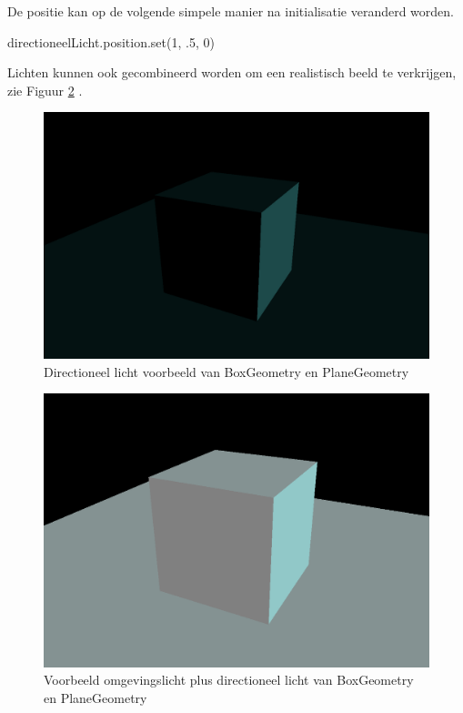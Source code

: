 De positie kan op de volgende simpele manier na initialisatie veranderd worden.

\begin{LVerbatim}
directioneelLicht.position.set(1, .5, 0)
\end{LVerbatim}

Lichten kunnen ook gecombineerd worden om een realistisch beeld te verkrijgen, zie Figuur  \ref{fig:ambientPlusDirectionalLight}  \autocite{Simon2023}.

\begin{figure}
	\centering
	\includegraphics[width=1\linewidth]{graphics/directionalLight}
	\caption[Directioneel licht voorbeeld van BoxGeometry en PlaneGeometry]{Directioneel licht voorbeeld van BoxGeometry en PlaneGeometry}
	\label{fig:directionalLight}
\end{figure}

\begin{figure}
	\centering
	\includegraphics[width=1\linewidth]{graphics/ambientPlusDirectionalLight}
	\caption[Voorbeeld omgevingslicht plus directioneel licht van BoxGeometry en PlaneGeometry]{Voorbeeld omgevingslicht plus directioneel licht van BoxGeometry en PlaneGeometry}
	\label{fig:ambientPlusDirectionalLight}
\end{figure}

